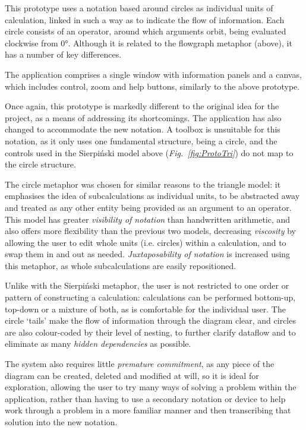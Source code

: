 \documentclass[12pt,twoside,notitlepage,xetex]{report}
\begin{document}
This prototype uses a notation based around circles as individual units of calculation, linked in such a way as to indicate the flow of information. Each circle consists of an operator, around which arguments orbit, being evaluated clockwise from 0°.  Although it is related to the flowgraph metaphor (above), it has a number of key differences.

The application comprises a single window with information panels and a canvas, which includes control, zoom and help buttons, similarly to the above prototype.

Once again, this prototype is markedly different to the original idea for the project, as a means of addressing its shortcomings.  The application has also changed to accommodate the new notation.  A toolbox is unsuitable for this notation, as it only uses one fundamental structure, being a circle, and the controls used in the Sierpiński model above (\emph{Fig.~\ref{fig:ProtoTri}}) do not map to the circle structure.

The circle metaphor was chosen for similar reasons to the triangle model: it emphasises the idea of subcalculations as individual units, to be abstracted away and treated as any other entity being provided as an argument to an operator.  This model has greater \emph{visibility of notation} than handwritten arithmetic, and also offers more flexibility than the previous two models, decreasing \emph{viscosity} by allowing the user to edit whole units (i.e. circles) within a calculation, and to swap them in and out as needed.  \emph{Juxtaposability of notation} is increased using this metaphor, as whole subcalculations are easily repositioned.

Unlike with the Sierpiński metaphor, the user is not restricted to one order or pattern of constructing a calculation: calculations can be performed bottom-up, top-down or a mixture of both, as is comfortable for the individual user.  The circle `tails' make the flow of information through the diagram clear, and circles are also colour-coded by their level of nesting, to further clarify dataflow and to eliminate as many \emph{hidden dependencies} as possible.

The system also requires little \emph{premature commitment}, as any piece of the diagram can be created, deleted and modified at will, so it is ideal for exploration, allowing the user to try many ways of solving a problem within the application, rather than having to use a secondary notation or device to help work through a problem in a more familiar manner and then transcribing that solution into the new notation.
\end{document}
